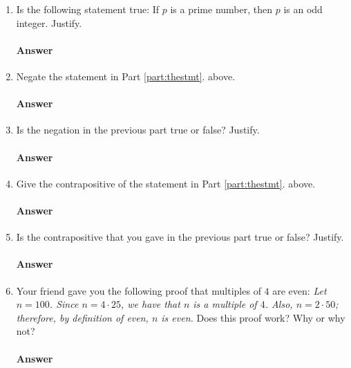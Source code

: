\collab{\todo{}}

\begin{enumerate}
    \item Is the following statement true: If $p$ is a prime number, then $p$ is an odd
        integer. Justify.\label{part:thestmt}
        \paragraph{Answer}
        \todo{}

    \item Negate the statement in Part \ref{part:thestmt}. above.
        \paragraph{Answer}
        \todo{}

    \item Is the negation in the previous part true or false? Justify.
        \paragraph{Answer}
        \todo{}

    \item Give the contrapositive of the statement in Part \ref{part:thestmt}. above.
        \paragraph{Answer}
        \todo{}

    \item Is the contrapositive that you gave in the previous part true or
        false? Justify.
        \paragraph{Answer}
        \todo{}

    \item Your friend gave you the following proof that multiples of $4$ are
        even: \emph{Let $n=100$.  Since $n=4\cdot 25$, we have that $n$ is a multiple
        of $4$.  Also, $n=2\cdot 50$; therefore, by definition of even, $n$ is
        even.}  Does this proof work?  Why or why not?
        \paragraph{Answer}
        \todo{}


\end{enumerate}
